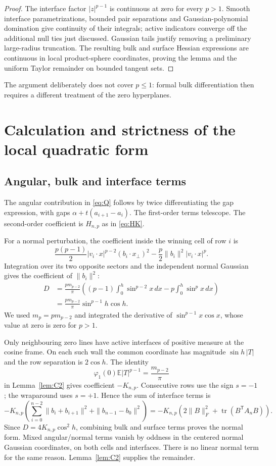 \documentclass[11pt,a4paper]{article}
\theoremstyle{remark}\newtheorem{remark}[theorem]{Remark}
\newcommand{\E}{\mathbb E}
\newcommand{\tr}{\operatorname{tr}}
\begin{document}
\begin{proof}
The interface factor $|z|^{p-1}$ is continuous at zero for every $p>1$. Smooth interface parametrizations, bounded pair separations and Gaussian-polynomial domination give continuity of their integrals; active indicators converge off the additional null ties just discussed. Gaussian tails justify removing a preliminary large-radius truncation. The resulting bulk and surface Hessian expressions are continuous in local product-sphere coordinates, proving the lemma and the uniform Taylor remainder on bounded tangent sets.
\end{proof}
The argument deliberately does not cover $p\le1$: formal bulk differentiation then requires a different treatment of the zero hyperplanes.

\section{Calculation and strictness of the local quadratic form}
\subsection{Angular, bulk and interface terms}
The angular contribution in \eqref{eq:Q} follows by twice differentiating the gap expression, with gaps $\alpha+t(a_{i+1}-a_i)$. The first-order terms telescope. The second-order coefficient is $H_{n,p}$ as in \eqref{eq:HK}.

For a normal perturbation, the coefficient inside the winning cell of row $i$ is
\[
 \frac{p(p-1)}2|v_i\cdot x|^{p-2}(b_i\cdot x_\perp)^2
 -\frac p2\|b_i\|^2|v_i\cdot x|^p.
\]
Integration over its two opposite sectors and the independent normal Gaussian gives the coefficient of $\|b_i\|^2$:
\begin{align*}
 D&=\frac{p m_{p-2}}\pi
 \left((p-1)\int_0^h\sin^{p-2}x\,dx
             -p\int_0^h\sin^p x\,dx\right)\\
 &=\frac{p m_{p-2}}\pi\sin^{p-1}h\cos h.
\end{align*}
We used $m_p=p m_{p-2}$ and integrated the derivative of
$\sin^{p-1}x\cos x$, whose value at zero is zero for $p>1$.

Only neighbouring zero lines have active interfaces of positive measure at the cosine frame. On each such wall the common coordinate has magnitude $\sin h\,|T|$ and the row separation is $2\cos h$. The identity
\[
 \varphi_1(0)\E|T|^{p-1}=\frac{m_{p-2}}\pi
\]
in Lemma~\ref{lem:C2} gives coefficient $-K_{n,p}$. Consecutive rows use the sign $s=-1$; the wraparound uses $s=+1$. Hence the sum of interface terms is
\[
 -K_{n,p}\left(\sum_{i=0}^{n-2}\|b_i+b_{i+1}\|^2+
                  \|b_{n-1}-b_0\|^2\right)
 =-K_{n,p}\left(2\|B\|_F^2+\tr(B^{\mathsf T}A_nB)\right).
\]
Since $D=4K_{n,p}\cos^2h$, combining bulk and surface terms proves the normal form. Mixed angular/normal terms vanish by oddness in the centered normal Gaussian coordinates, on both cells and interfaces. There is no linear normal term for the same reason. Lemma~\ref{lem:C2} supplies the remainder.
\end{document}

